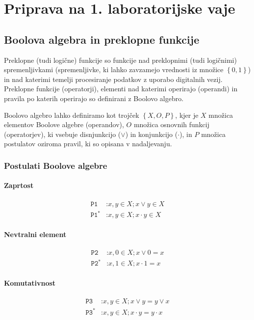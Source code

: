 \chapter{Priprava na 1. laboratorijske vaje}

\section{Boolova algebra in preklopne funkcije}

Preklopne (tudi logične) funkcije so funkcije nad preklopnimi (tudi logičnimi) spremenljivkami (spremenljivke, ki lahko zavzamejo vrednosti iz množice $\left\{0, 1\right\}$) in nad katerimi temelji procesiranje podatkov z uporabo digitalnih vezij. Preklopne funkcije (operatorji), elementi nad katerimi operirajo (operandi) in pravila po katerih operirajo so definirani z Boolovo algebro.

Boolovo algebro lahko definiramo kot trojček $\left\{X, O, P\right\}$, kjer je $X$ množica elementov Boolove algebre (operandov), $O$ množica osnovnih funkcij (operatorjev), ki vsebuje disnjunkcijo ($\vee$) in konjunkcijo ($\cdot$), in $P$ množica postulatov oziroma pravil, ki so opisana v nadaljevanju.

\subsection{Postulati Boolove algebre}
\subsubsection*{Zaprtost}
\begin{align*}
\texttt{P1}&\texttt{:}x,y \in X; x \vee y \in X\\
\texttt{P1}^*&\texttt{:}x,y \in X; x \cdot y \in X
\end{align*}

\subsubsection*{Nevtralni element}
\begin{align*}
\texttt{P2}&\texttt{:}x,0 \in X; x \vee 0 = x\\
\texttt{P2}^*&\texttt{:}x,1 \in X; x \cdot 1 = x
\end{align*}

\subsubsection*{Komutativnost}
\begin{align*}
\texttt{P3}&\texttt{:}x,y \in X; x \vee y = y \vee x\\
\texttt{P3}^*&\texttt{:}x,y \in X; x \cdot y = y \cdot x
\end{align*}

